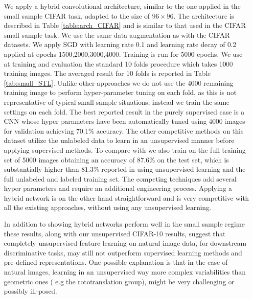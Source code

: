 \documentclass[10pt,twocolumn,letterpaper]{article}
\newcommand{\citep}{\cite}
\begin{document}
We apply a hybrid convolutional architecture, similar to the one applied in the small sample CIFAR task, adapted to the size of $96\times 96$. The architecture is described in Table \ref{table:arch_CIFAR} and is similar to that used in the CIFAR small sample task. We use the same data augmentation as with the CIFAR datasets. We apply SGD with learning rate 0.1 and learning rate decay of 0.2 applied at epochs 1500,2000,3000,4000. Training is run for 5000 epochs. We use at training and evaluation the standard 10 folds procedure which takes 1000 training images. The averaged result for 10 folds is reported in Table \ref{tab:small_STL}. Unlike other approaches we do not use the 4000 remaining training image to perform hyper-parameter tuning on each fold, as this is not representative of typical small sample situations, instead we train the same settings on each fold. The best reported result in the purely supervised case is a CNN \citep{swersky2013multi,dosovitskiy2014discriminative} whose hyper parameters have been automatically tuned using 4000 images for validation achieving 70.1$\%$ accuracy. The other competitive methods on this dataset utilize the unlabeled data to learn in an unsupervised manner before applying supervised methods. To compare with \cite{hoffer2016deep} we also train on the full training set of 5000 images obtaining an accuracy of $87.6\%$ on the test set, which is substantially higher than $81.3\%$ reported in \cite{hoffer2016deep} using unsupervised learning and the full unlabeled and labeled training set. The competing techniques add several hyper parameters and require an additional engineering process. Applying a hybrid network is on the other hand straightforward and is very competitive with all the existing approaches, without using any unsupervised learning. 

In addition to showing hybrid networks perform well in the small sample regime these results, along with our unsupervised CIFAR-10 results, suggest that completely unsupervised feature learning on natural image data, for downstream discriminative tasks, may still not outperform supervised learning methods and pre-defined representations. One possible explanation is that in the case of natural images, learning in an unsupervised way more complex variabilities than geometric ones ( e.g the rototranslation group), might be very challenging or possibly ill-posed.
\end{document}
